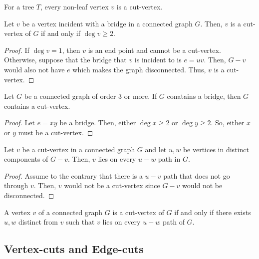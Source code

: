 \begin{remark}
  For a tree \(T\), every non-leaf vertex \(v\) is a cut-vertex.
\end{remark}

\begin{theorem}
  Let \(v\) be a vertex incident with a bridge in a connected
  graph \(G\). Then, \(v\) is a cut-vertex of \(G\) if and only
  if \(\deg v \geq 2\).
\end{theorem}

\begin{proof}
  If \(\deg v = 1\), then \(v\) is an end point and cannot be a
  cut-vertex. Otherwise, suppose that the bridge that \(v\) is
  incident to is \(e=uv\). Then, \(G-v\) would also not have
  \(e\) which makes the graph disconnected. Thus, \(v\) is a
  cut-vertex.
\end{proof}

\begin{corollary}
  Let \(G\) be a connected graph of order 3 or more. If \(G\)
  conatains a bridge, then \(G\) contains a cut-vertex.
\end{corollary}

\begin{proof}
  Let \(e = xy\) be a bridge. Then, either \(\deg x \geq 2\) or
  \(\deg y \geq 2\). So, either \(x\) or \(y\) must be a
  cut-vertex.
\end{proof}

\begin{theorem}
  Let \(v\) be a cut-vertex in a connected graph \(G\) and let
  \(u, w\) be vertices in distinct components of \(G-v\). Then,
  \(v\) lies on every \(u-w\) path in \(G\).
\end{theorem}

\begin{proof}
  Assume to the contrary that there is a \(u-v\) path that does
  not go through \(v\). Then, \(v\) would not be a cut-vertex
  since \(G-v\) would not be disconnected.
\end{proof}

\begin{corollary}
  A vertex \(v\) of a connected graph \(G\) is a cut-vertex of
  \(G\) if and only if there exists \(u, w\) distinct from \(v\)
  such that \(v\) lies on every \(u-w\) path of \(G\).
\end{corollary}

\subsection{Vertex-cuts and Edge-cuts}

